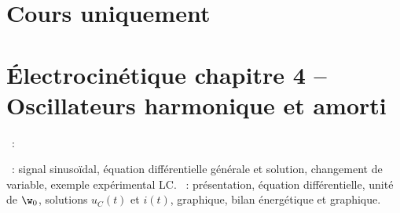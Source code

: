 \documentclass[a4paper, 12pt, final, garamond]{book}
\begin{document}
\section{Cours uniquement}
\section*{Électrocinétique chapitre 4 -- Oscillateurs harmonique et amorti}

\begin{enumerate}[label=\Roman*]
	~:
	\begin{enumerate}[label=\Alph*]
		~: signal sinusoïdal, équation différentielle
		générale et solution, changement de variable, exemple expérimental LC.
		~: présentation, équation
		différentielle, unité de $\w_0$, solutions $u_C(t)$ et $i(t)$, graphique,
		bilan énergétique et graphique.
	\end{enumerate}
\end{enumerate}
\end{document}
